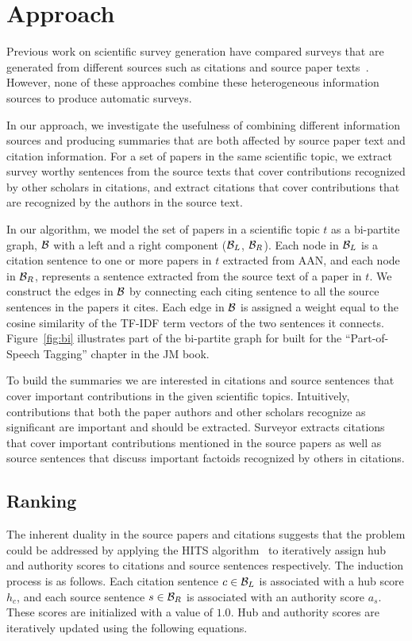 \section{Approach}
\label{sec:approach}

Previous work on scientific survey generation have compared surveys that are generated from different sources such as citations and source paper texts~\cite{Qazvinian&Radev08a,mei&zhai08,mohammad-EtAl:2009:NAACLHLT09}. However, none of these approaches combine these heterogeneous information sources to produce automatic surveys. 

In our approach, we investigate the usefulness of combining different information sources and producing summaries that are both affected by source paper text and citation information. For a set of papers in the same scientific topic, we extract survey worthy sentences from the source texts that cover contributions recognized by other scholars in citations, and extract citations that cover contributions that are recognized by the authors in the source text.

In our algorithm, we model the set of papers in a scientific topic $t$ as a bi-partite graph, $\B$ with a left and a right component ($\B_L$, $\B_R$). Each node in $\B_L$ is a citation sentence to one or more papers in $t$ extracted from AAN, and each node in $\B_R$, represents a sentence extracted from the source text of a paper in $t$. We construct the edges in $\B$ by connecting each citing sentence to all the source sentences in the papers it cites. Each edge in $\B$ is assigned a weight equal to the cosine similarity of the TF-IDF term vectors of the two sentences it connects. 
Figure~\ref{fig:bi} illustrates part of the bi-partite graph for built for the ``Part-of-Speech Tagging'' chapter in the JM book.

To build the summaries we are interested in citations and source sentences that cover important contributions in the given scientific topics. Intuitively, contributions that both the paper authors and other scholars recognize as significant are important and should be extracted. Surveyor extracts citations that cover important contributions mentioned in the source papers as well as source sentences that discuss important factoids recognized by others in citations.


\subsection{Ranking}
The inherent duality in the source papers and citations suggests that the problem could be addressed by applying the HITS algorithm~\cite{Kleinberg:1999} to iteratively assign hub and authority scores to citations and source sentences respectively. The induction process is as follows. Each citation sentence $c\in \B_L$ is associated with a hub score $h_c$, and each source sentence $s\in \B_R$ is associated with an authority score $a_s$. These scores are initialized with a value of $1.0$.  Hub and authority scores are iteratively updated using the following equations.

